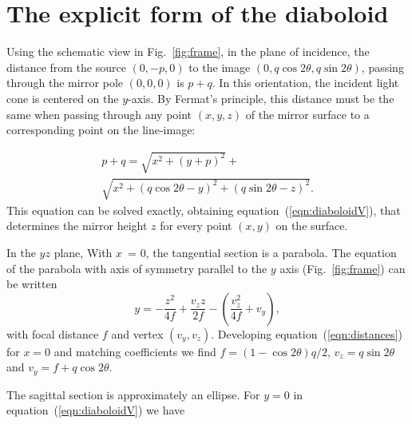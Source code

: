 \documentclass{iucr}       %
\begin{document}
\appendix

\section{The explicit form of the diaboloid }
\label{appendix:diaboloid}

Using the schematic view in Fig.~\ref{fig:frame}, in the plane of incidence, the distance from the source $(0,-p,0)$ to the image $(0,q \cos2\theta, q \sin2\theta)$, passing through the mirror pole $(0,0,0)$ is $p+q$. In this orientation, the incident light cone is centered on the $y$-axis. By Fermat's principle, this distance must be the same when passing through any point $(x,y,z)$ of the mirror surface to a corresponding point on the line-image:

\begin{multline}
\label{eqn:distances}
p + q = 
\sqrt{x^2 + (y + p)^2} + \\
\sqrt{x^2 + (q \cos2 \theta - y)^2 + (q \sin2 \theta - z)^2}.
\end{multline}
This equation can be solved exactly, obtaining equation~(\ref{eqn:diaboloidV}), that determines the mirror height $z$ for every point $(x,y)$ on the surface.

In the $yz$ plane, With $x$~= 0, the tangential section is a parabola. The equation of the parabola with axis of symmetry parallel to the $y$ axis (Fig.~\ref{fig:frame}) can be written 
\begin{equation}
y = -\frac{z^2}{4 f} + \frac{v_z z}{2 f} - \left(\frac{v_z^2}{4 f} + v_y\right),
\end{equation}
\noindent with focal distance $f$ and vertex $(v_y,v_z)$. Developing equation~(\ref{eqn:distances}) for $x=0$ and matching coefficients we find $f=(1-\cos2\theta)q/2$, $v_z=q \sin2\theta$ and $v_y=f+q\cos2\theta$.

The sagittal section is approximately an ellipse. For $y=0$ in equation~(\ref{eqn:diaboloidV}) we have
\end{document}
